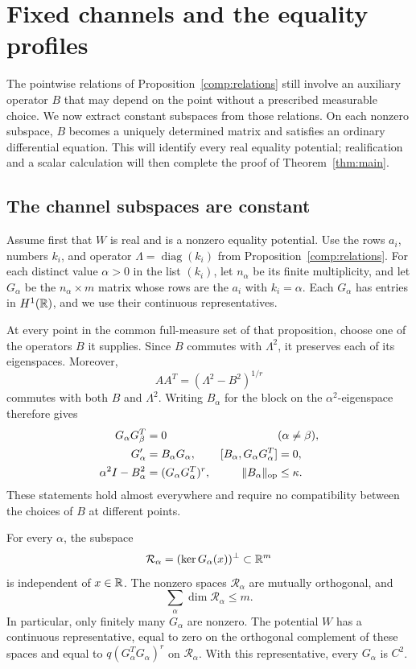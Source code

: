 \section{Fixed channels and the equality profiles}
\label{rig:section}

The pointwise relations of Proposition~\ref{comp:relations} still involve
an auxiliary operator $B$ that may depend on the point without a prescribed
measurable choice.  We now extract constant subspaces from those relations.
On each nonzero subspace, $B$ becomes a uniquely determined matrix and
satisfies an ordinary differential equation.  This will identify every
real equality potential; realification and a scalar calculation will then
complete the proof of Theorem~\ref{thm:main}.

\subsection{The channel subspaces are constant}

Assume first that $W$ is real and is a nonzero equality potential.  Use the
rows $a_i$, numbers $k_i$, and operator $\Lambda=\operatorname{diag}(k_i)$
from Proposition~\ref{comp:relations}.  For each distinct value $\alpha>0$
in the list $(k_i)$, let $n_\alpha$ be its finite multiplicity, and let
$G_\alpha$ be the $n_\alpha\times m$ matrix whose rows are the $a_i$ with
$k_i=\alpha$.  Each $G_\alpha$ has entries in $H^1(\mathbb R)$, and we use their
continuous representatives.

At every point in the common full-measure set of that proposition, choose
one of the operators $B$ it supplies.  Since $B$ commutes with $\Lambda^2$,
it preserves each of its eigenspaces.  Moreover,
\[
 AA^T=(\Lambda^2-B^2)^{1/r}
\]
commutes with both $B$ and $\Lambda^2$.  Writing $B_\alpha$ for the block
on the $\alpha^2$-eigenspace therefore gives
\begin{align}
 G_\alpha G_\beta^T&=0 &&(\alpha\ne\beta),
 \label{rig:orthogonal-blocks}\\
 G_\alpha'&=B_\alpha G_\alpha,
 & [B_\alpha,G_\alpha G_\alpha^T]&=0,
 \label{rig:block-first-order}\\
 \alpha^2I-B_\alpha^2&=(G_\alpha G_\alpha^T)^r,
 &\|B_\alpha\|_{\operatorname{op}}&\le\kappa.
 \label{rig:block-square}
\end{align}
These statements hold almost everywhere and require no compatibility
between the choices of $B$ at different points.

\begin{lemma}\label{rig:fixed-right-spaces}
For every $\alpha$, the subspace
\[
 \mathcal R_\alpha=(\ker G_\alpha(x))^\perp\subset\mathbb R^m
\]
is independent of $x\in\mathbb R$.  The nonzero spaces $\mathcal R_\alpha$ are
mutually orthogonal, and
\begin{equation}\label{rig:dimension-bound}
 \sum_\alpha\dim\mathcal R_\alpha\le m.
\end{equation}
In particular, only finitely many $G_\alpha$ are nonzero.  The potential
$W$ has a continuous representative, equal to zero on the orthogonal
complement of these spaces and equal to
$q(G_\alpha^TG_\alpha)^r$ on $\mathcal R_\alpha$.  With this
representative, every $G_\alpha$ is $C^2$.
\end{lemma}

